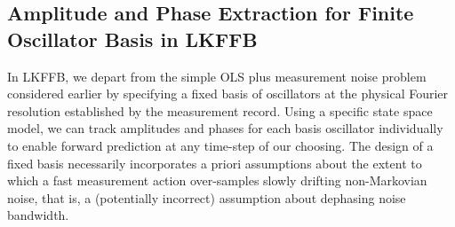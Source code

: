 \subsection{Amplitude and Phase Extraction for Finite Oscillator Basis in LKFFB \label{sec:app:subsec:LKFFB}}
 In LKFFB, we depart from the simple OLS plus measurement noise problem considered earlier by specifying a fixed basis of oscillators at the physical Fourier resolution established by the measurement record. Using a specific state space model, we can track amplitudes and phases for each basis oscillator individually to enable forward prediction at any time-step of our choosing. The design of a fixed basis necessarily incorporates a priori assumptions about the extent to which a fast measurement action over-samples slowly drifting non-Markovian noise, that is, a (potentially incorrect) assumption about dephasing noise bandwidth.
 
